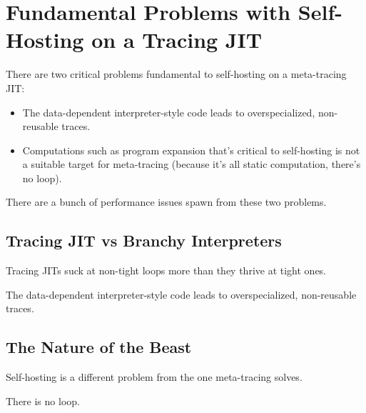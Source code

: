 \chapter{Fundamental Problems with Self-Hosting on a Tracing JIT}

	\begin{chapterpoint}
		There are two critical problems fundamental to self-hosting on a meta-tracing JIT:
		\begin{itemize}
			\item The data-dependent interpreter-style code leads to overspecialized, non-reusable traces.
			\item Computations such as program expansion that's critical to self-hosting is not a suitable target for meta-tracing (because it's all static computation, there's no loop).
		\end{itemize}
		There are a bunch of performance issues spawn from these two problems. 
	\end{chapterpoint}

	\section{Tracing JIT vs Branchy Interpreters}
		\begin{mainpoint}	
		 	Tracing JITs suck at non-tight loops more than they thrive at tight ones.

			The data-dependent interpreter-style code leads to overspecialized, non-reusable traces.
		\end{mainpoint}

	\section{The Nature of the Beast}
		\begin{mainpoint}
			Self-hosting is a different problem from the one meta-tracing solves.
		
			There is no loop.
		\end{mainpoint}
